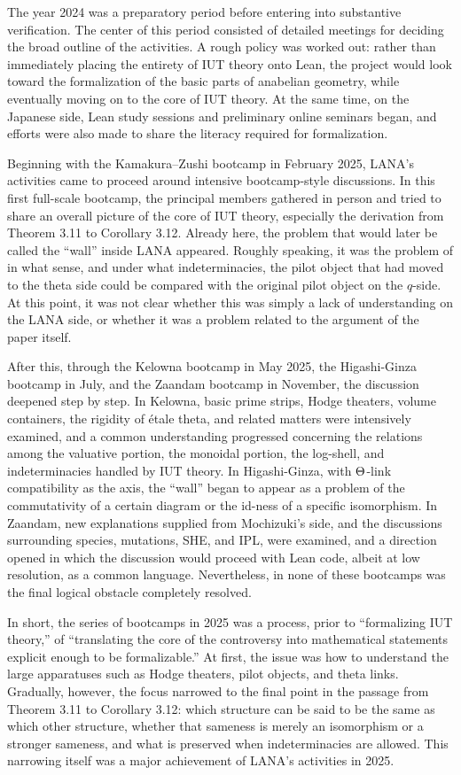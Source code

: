 \documentclass[12pt, reqno, a4paper]{amsart}
\begin{document}
The year 2024 was a preparatory period before entering into substantive verification. The center of this period consisted of detailed meetings for deciding the broad outline of the activities. A rough policy was worked out: rather than immediately placing the entirety of IUT theory onto Lean, the project would look toward the formalization of the basic parts of anabelian geometry, while eventually moving on to the core of IUT theory. At the same time, on the Japanese side, Lean study sessions and preliminary online seminars began, and efforts were also made to share the literacy required for formalization. 

Beginning with the Kamakura--Zushi bootcamp in February 2025, LANA's activities came to proceed around intensive bootcamp-style discussions. In this first full-scale bootcamp, the principal members gathered in person and tried to share an overall picture of the core of IUT theory, especially the derivation from Theorem 3.11 to Corollary 3.12. Already here, the problem that would later be called the ``wall'' inside LANA appeared. Roughly speaking, it was the problem of in what sense, and under what indeterminacies, the pilot object that had moved to the theta side could be compared with the original pilot object on the $q$-side. At this point, it was not clear whether this was simply a lack of understanding on the LANA side, or whether it was a problem related to the argument of the paper itself.

After this, through the Kelowna bootcamp in May 2025, the Higashi-Ginza bootcamp in July, and the Zaandam bootcamp in November, the discussion deepened step by step. In Kelowna, basic prime strips, Hodge theaters, volume containers, the rigidity of \'etale theta, and related matters were intensively examined, and a common understanding progressed concerning the relations among the valuative portion, the monoidal portion, the log-shell, and indeterminacies handled by IUT theory. In Higashi-Ginza, with $\Th$-link compatibility as the axis, the ``wall'' began to appear as a problem of the commutativity of a certain diagram or the id-ness of a specific isomorphism. In Zaandam, new explanations supplied from Mochizuki's side, and the discussions surrounding species, mutations, SHE, and IPL, were examined, and a direction opened in which the discussion would proceed with Lean code, albeit at low resolution, as a common language. Nevertheless, in none of these bootcamps was the final logical obstacle completely resolved.

In short, the series of bootcamps in 2025 was a process, prior to ``formalizing IUT theory,'' of ``translating the core of the controversy into mathematical statements explicit enough to be formalizable.'' At first, the issue was how to understand the large apparatuses such as Hodge theaters, pilot objects, and theta links. Gradually, however, the focus narrowed to the final point in the passage from Theorem 3.11 to Corollary 3.12: which structure can be said to be the same as which other structure, whether that sameness is merely an isomorphism or a stronger sameness, and what is preserved when indeterminacies are allowed. This narrowing itself was a major achievement of LANA's activities in 2025.
\end{document}
